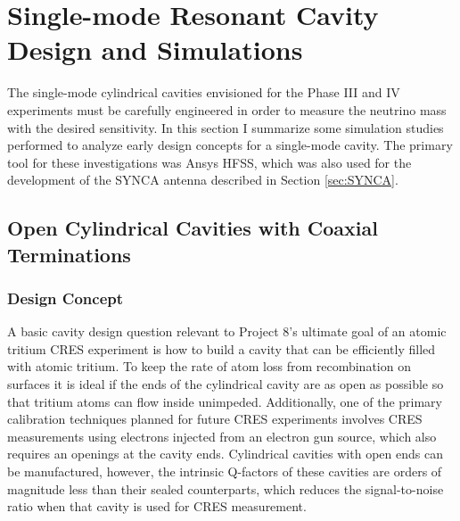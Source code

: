 \section{Single-mode Resonant Cavity Design and Simulations}
\label{sec:chap6-single-mode-cavity-sims}

The single-mode cylindrical cavities envisioned for the Phase III and IV experiments must be carefully engineered in order to measure the neutrino mass with the desired sensitivity. In this section I summarize some simulation studies performed to analyze early design concepts for a single-mode cavity. The primary tool for these investigations was Ansys HFSS, which was also used for the development of the SYNCA antenna described in Section \ref{sec:SYNCA}. 

\subsection{Open Cylindrical Cavities with Coaxial Terminations}
\label{sec:chap6-open-cavities}

\subsubsection*{Design Concept}

A basic cavity design question relevant to Project 8's ultimate goal of an atomic tritium CRES experiment is how to build a cavity that can be efficiently filled with atomic tritium. To keep the rate of atom loss from recombination on surfaces it is ideal if the ends of the cylindrical cavity are as open as possible so that tritium atoms can flow inside unimpeded. Additionally, one of the primary calibration techniques planned for future CRES experiments involves CRES measurements using electrons injected from an electron gun source, which also requires an openings at the cavity ends. Cylindrical cavities with open ends can be manufactured, however, the intrinsic Q-factors of these cavities are orders of magnitude less than their sealed counterparts, which reduces the signal-to-noise ratio when that cavity is used for CRES measurement.

